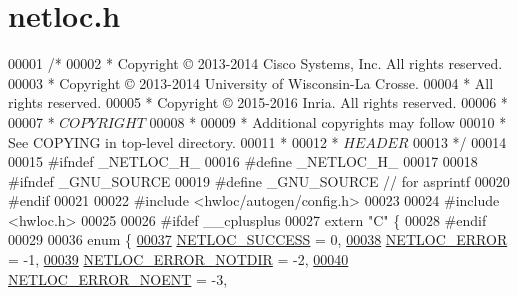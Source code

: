 \hypertarget{a00179_source}{}\section{netloc.\+h}
\label{a00179_source}

\begin{DoxyCode}
00001 \textcolor{comment}{/*}
00002 \textcolor{comment}{ * Copyright © 2013-2014 Cisco Systems, Inc.  All rights reserved.}
00003 \textcolor{comment}{ * Copyright © 2013-2014 University of Wisconsin-La Crosse.}
00004 \textcolor{comment}{ *                         All rights reserved.}
00005 \textcolor{comment}{ * Copyright © 2015-2016 Inria.  All rights reserved.}
00006 \textcolor{comment}{ *}
00007 \textcolor{comment}{ * $COPYRIGHT$}
00008 \textcolor{comment}{ *}
00009 \textcolor{comment}{ * Additional copyrights may follow}
00010 \textcolor{comment}{ * See COPYING in top-level directory.}
00011 \textcolor{comment}{ *}
00012 \textcolor{comment}{ * $HEADER$}
00013 \textcolor{comment}{ */}
00014 
00015 \textcolor{preprocessor}{#ifndef \_NETLOC\_H\_}
00016 \textcolor{preprocessor}{#define \_NETLOC\_H\_}
00017 
00018 \textcolor{preprocessor}{#ifndef \_GNU\_SOURCE}
00019 \textcolor{preprocessor}{#define \_GNU\_SOURCE // for asprintf}
00020 \textcolor{preprocessor}{#endif}
00021 
00022 \textcolor{preprocessor}{#include <hwloc/autogen/config.h>}
00023 
00024 \textcolor{preprocessor}{#include <hwloc.h>}
00025 
00026 \textcolor{preprocessor}{#ifdef \_\_cplusplus}
00027 \textcolor{keyword}{extern} \textcolor{stringliteral}{"C"} \{
00028 \textcolor{preprocessor}{#endif}
00029 
00036 \textcolor{keyword}{enum} \{
\hyperlink{a00234_gga61dadd085c1777f559549e05962b2c9ea4deb864e4b46fe70b83c3220442a627c}{00037}     \hyperlink{a00234_gga61dadd085c1777f559549e05962b2c9ea4deb864e4b46fe70b83c3220442a627c}{NETLOC\_SUCCESS}         =  0, 
\hyperlink{a00234_gga61dadd085c1777f559549e05962b2c9ea4b33f8da6efc963562a93569ac8b349a}{00038}     \hyperlink{a00234_gga61dadd085c1777f559549e05962b2c9ea4b33f8da6efc963562a93569ac8b349a}{NETLOC\_ERROR}           = -1, 
\hyperlink{a00234_gga61dadd085c1777f559549e05962b2c9ea6e4322619d38dec18dbd16a606b14aa8}{00039}     \hyperlink{a00234_gga61dadd085c1777f559549e05962b2c9ea6e4322619d38dec18dbd16a606b14aa8}{NETLOC\_ERROR\_NOTDIR}    = -2, 
\hyperlink{a00234_gga61dadd085c1777f559549e05962b2c9ea81bc77a77d1a42054dc64b11a4cc8612}{00040}     \hyperlink{a00234_gga61dadd085c1777f559549e05962b2c9ea81bc77a77d1a42054dc64b11a4cc8612}{NETLOC\_ERROR\_NOENT}     = -3, 

\end{DoxyCode}
